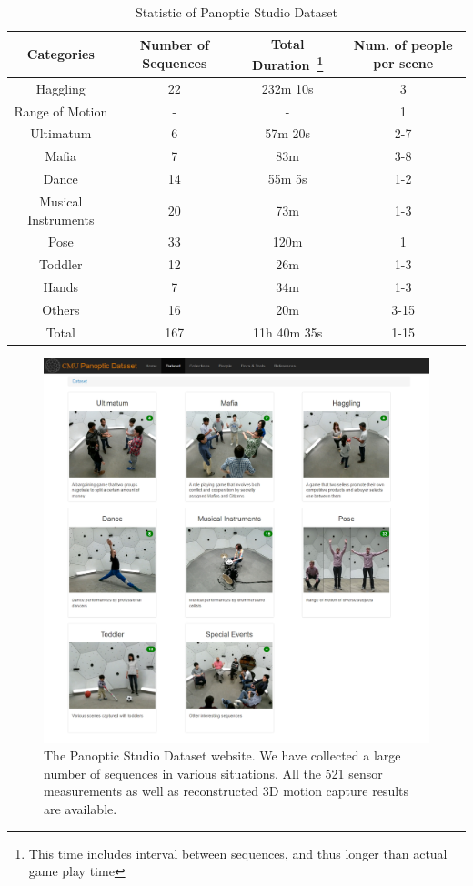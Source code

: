 \begin{table}[h]
	\centering
	\caption{Statistic of Panoptic Studio Dataset}
	\label{table:dataset}
	\begin{tabular}{c| c | c | c }
		\hline	
		Categories & Number of Sequences  & Total Duration~\footnote{This time includes interval between sequences, and thus longer than actual game play time}  & Num. of people per scene \\
		\hline	
		Haggling & 22  & 232m 10s  & 3   \\
		\hline	
		Range of Motion &  - & - & 1   \\
		\hline	
		Ultimatum &  6 & 57m 20s & 2-7   \\
		\hline	
		Mafia &  7 &  83m & 3-8   \\
		\hline	
		Dance&  14& 55m 5s & 1-2   \\
		\hline	
		Musical Instruments& 20 & 73m  & 1-3  \\
		\hline	
		Pose& 33 & 120m  & 1  \\ 
		\hline	
		Toddler& 12 & 26m & 1-3  \\ 
		\hline	
		Hands&  7 &  34m & 1-3  \\ 
		\hline	
		Others& 16 & 20m & 3-15 \\
		\hline	
		\hline	
		Total& 167 & 11h 40m 35s & 1-15\\
		\hline	
	\end{tabular}
\end{table}

\begin{figure}
	\centering
	\includegraphics[height=0.95\textwidth]{figures/domedb}
	\caption{The Panoptic Studio Dataset website. We have collected a large number of sequences in various situations. All the 521 sensor measurements as well as reconstructed 3D motion capture results are available.} 
	\label{fig:domedb}
\end{figure}

